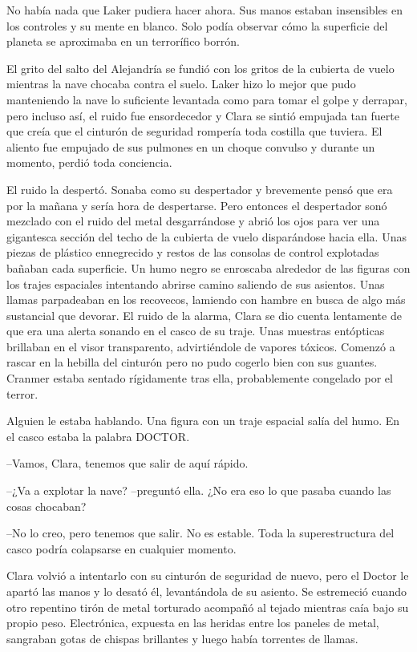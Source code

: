 {No había nada que Laker pudiera hacer ahora. Sus manos estaban
 insensibles en los controles y su mente en blanco. Solo podía observar
 cómo la superficie del planeta se aproximaba en un terrorífico
 borrón.}

{El grito del salto del Alejandría se fundió con
 los gritos de la cubierta de vuelo mientras la nave chocaba contra el
 suelo. Laker hizo lo mejor que pudo manteniendo la nave lo suficiente
 levantada como para tomar el golpe y derrapar, pero incluso así, el
 ruido fue ensordecedor y Clara se sintió empujada tan fuerte que creía
 que el cinturón de seguridad rompería toda costilla que tuviera. El
 aliento fue empujado de sus pulmones en un choque convulso y durante un
momento, perdió toda conciencia.}

{El ruido la despertó. Sonaba como su despertador y brevemente pensó que
 era por la mañana y sería hora de despertarse. Pero entonces el
 despertador sonó mezclado con el ruido del metal desgarrándose y abrió
 los ojos para ver una gigantesca sección del techo de la cubierta de
 vuelo disparándose hacia ella. Unas piezas de plástico ennegrecido y
 restos de las consolas de control explotadas bañaban cada superficie. Un
 humo negro se enroscaba alrededor de las figuras con los trajes
 espaciales intentando abrirse camino saliendo de sus asientos. Unas
 llamas parpadeaban en los recovecos, lamiendo con hambre en busca de
 algo más sustancial que devorar. El ruido de la alarma, Clara se dio
 cuenta lentamente de que era una alerta sonando en el casco de su traje.
 Unas muestras entópticas brillaban en el visor transparento,
 advirtiéndole de vapores tóxicos. Comenzó a rascar en la hebilla del
 cinturón pero no pudo cogerlo bien con sus guantes. Cranmer estaba
sentado rígidamente tras ella, probablemente congelado por el terror.}

{Alguien le estaba hablando. Una figura con un traje espacial salía del
humo. En el casco estaba la palabra DOCTOR.}

{--Vamos, Clara, tenemos que salir de aquí rápido.}

{--¿Va a explotar la nave? --preguntó ella. ¿No era eso lo que pasaba
cuando las cosas chocaban?}

{--No lo creo, pero tenemos que salir. No es estable. Toda la
superestructura del casco podría colapsarse en cualquier momento.}

{Clara volvió a intentarlo con su cinturón de seguridad de nuevo, pero el
 Doctor le apartó las manos y lo desató él, levantándola de su asiento.
 Se estremeció cuando otro repentino tirón de metal torturado acompañó al
 tejado mientras caía bajo su propio peso. Electrónica, expuesta en las
 heridas entre los paneles de metal, sangraban gotas de chispas
brillantes y luego había torrentes de llamas.}

